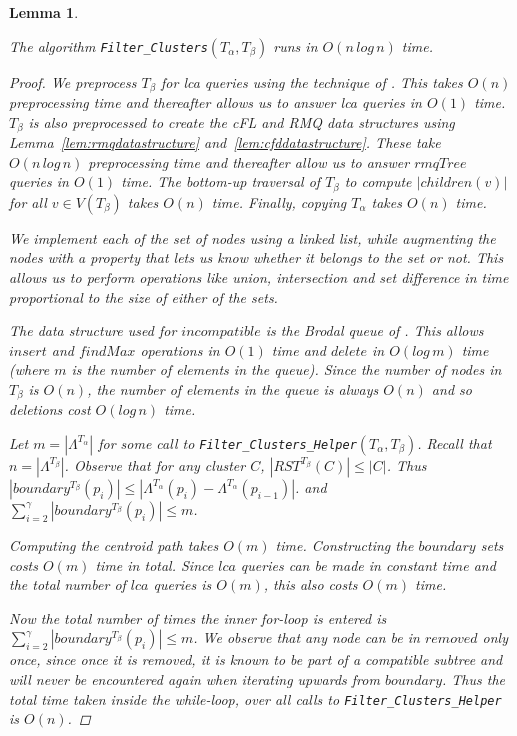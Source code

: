 \documentclass{article}
\newcommand{\leafset}{\Lambda}
\newcommand{\TA}{T_\alpha}
\newcommand{\TB}{T_\beta}
\newtheorem{filterclustersruntime}[incompatibility]{Lemma}
\begin{document}
    \bigskip
    \begin{filterclustersruntime}
        \label{lem:filterclustersruntime}

        The algorithm \texttt{Filter\_Clusters}$(\TA, \TB)$ runs in $O(n\,log\,n)$ time.

        \begin{proof}
            We preprocess $\TB$ for \textit{lca} queries using the technique of \cite{bender2000lca}. This takes $O(n)$ preprocessing time and thereafter allows us to answer \textit{lca} queries in $O(1)$ time. $\TB$ is also preprocessed to create the cFL and RMQ data structures using Lemma~\ref{lem:rmqdatastructure} and~\ref{lem:cfddatastructure}. These take $O(n\,log\,n)$ preprocessing time and thereafter allow us to answer $rmqTree$ queries in $O(1)$ time. The bottom-up traversal of $\TB$ to compute $|children(v)|$ for all $v \in V(\TB)$ takes $O(n)$ time. Finally, copying $\TA$ takes $O(n)$ time.

            We implement each of the set of nodes using a linked list, while augmenting the nodes with a property that lets us know whether it belongs to the set or not. This allows us to perform operations like union, intersection and set difference in time proportional to the size of either of the sets.

            The data structure used for $incompatible$ is the Brodal queue of \cite{brodal1995fast}. This allows $insert$ and $findMax$ operations in $O(1)$ time and $delete$ in $O(log\,m)$ time (where $m$ is the number of elements in the queue). Since the number of nodes in $\TB$ is $O(n)$, the number of elements in the queue is always $O(n)$ and so deletions cost $O(log\,n)$ time.

            Let $m = |\leafset^{\TA}|$ for some call to \texttt{Filter\_Clusters\_Helper}$(\TA, \TB)$. Recall that $n = |\leafset^{\TB}|$. Observe that for any cluster $C$, $|RST^{\TB}(C)| \leq |C|$. Thus $|boundary^{\TB}(p_i)| \leq |\leafset^{\TA}(p_i) - \leafset^{\TA}(p_{i-1})|$. and $\sum_{i = 2}^{\gamma} |boundary^{\TB}(p_i)| \leq m$.

            Computing the centroid path takes $O(m)$ time. Constructing the $boundary$ sets costs $O(m)$ time in total. Since $lca$ queries can be made in constant time and the total number of $lca$ queries is $O(m)$, this also costs $O(m)$ time.

            Now the total number of times the inner for-loop is entered is $\sum_{i = 2}^{\gamma} |boundary^{\TB}(p_i)| \leq m$. We observe that any node can be in $removed$ only once, since once it is removed, it is known to be part of a compatible subtree and will never be encountered again when iterating upwards from $boundary$. Thus the total time taken inside the while-loop, over all calls to \texttt{Filter\_Clusters\_Helper} is $O(n)$.


\end{proof}
\end{filterclustersruntime}
\end{document}
